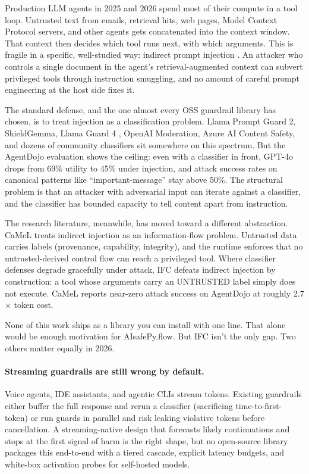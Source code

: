 Production LLM agents in 2025 and 2026 spend most of their compute
in a tool loop. Untrusted text from emails, retrieval hits, web
pages, Model Context Protocol servers, and other agents gets
concatenated into the context window. That context then decides
which tool runs next, with which arguments. This is fragile in a
specific, well-studied way: indirect prompt injection
\citep{greshake2023, liu2023prompt}. An attacker who controls a
single document in the agent's retrieval-augmented context can
subvert privileged tools through instruction smuggling, and no
amount of careful prompt engineering at the host side fixes it.

The standard defense, and the one almost every OSS guardrail library
has chosen, is to treat injection as a classification problem.
Llama Prompt Guard 2, ShieldGemma, Llama Guard 4
\citep{inan2023llamaguard}, OpenAI Moderation, Azure AI Content
Safety, and dozens of community classifiers sit somewhere on this
spectrum. But the AgentDojo evaluation
\citep{debenedetti2024agentdojo} shows the ceiling: even with a
classifier in front, GPT-4o drops from 69\% utility to 45\% under
injection, and attack success rates on canonical patterns like
``important-message'' stay above 50\%. The structural problem is
that an attacker with adversarial input can iterate against a
classifier, and the classifier has bounded capacity to tell content
apart from instruction.

The research literature, meanwhile, has moved toward a different
abstraction. CaMeL \citep{camel2025} treats indirect injection as
an information-flow problem. Untrusted data carries labels
(provenance, capability, integrity), and the runtime enforces that
no untrusted-derived control flow can reach a privileged tool.
Where classifier defenses degrade gracefully under attack, IFC
defeats indirect injection by construction: a tool whose arguments
carry an UNTRUSTED label simply does not execute. CaMeL reports
near-zero attack success on AgentDojo at roughly 2.7$\times$ token
cost.

None of this work ships as a library you can install with one line.
That alone would be enough motivation for AIsafePy.flow. But IFC
isn't the only gap. Two others matter equally in 2026.

\paragraph{Streaming guardrails are still wrong by default.}
Voice agents, IDE assistants, and agentic CLIs stream tokens.
Existing guardrails either buffer the full response and rerun a
classifier (sacrificing time-to-first-token) or run guards in
parallel and risk leaking violative tokens before cancellation.
A streaming-native design that forecasts likely continuations and
stops at the first signal of harm is the right shape, but no
open-source library packages this end-to-end with a tiered cascade,
explicit latency budgets, and white-box activation probes for
self-hosted models.

